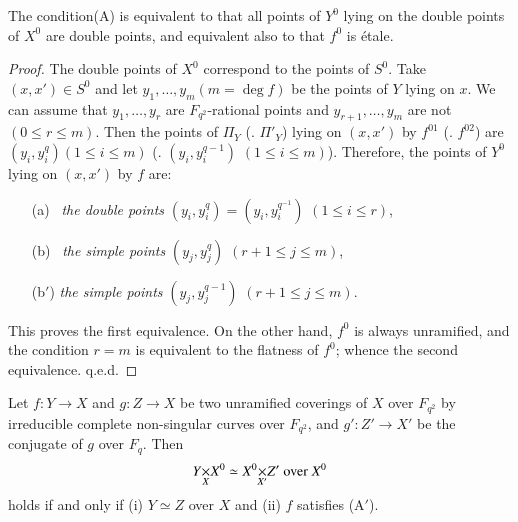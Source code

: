 \setcounter{subprop}{4}
\begin{subprop}\label{art6-subprop4.2.5}
The condition\pageoriginale (A) is equivalent to that all points of $Y^0$ lying on the double points of $X^0$ are double points, and equivalent also to that $f^0$ is \'etale.
\end{subprop}

\begin{proof}
The double points of $X^0$ correspond to the points of $S^0$. Take $(x, x') \in S^0$ and let $y_1, \ldots, y_m (m = \deg f)$ be the points of $Y$ lying on $x$. We can assume that $y_1, \ldots, y_r$ are $F_{q^2}$-rational points and $y_{r+1}, \ldots, y_m$ are not $(0 \leqslant r \leqslant m)$. Then the points of $\Pi_Y$ (\resp. $\Pi'_Y$) lying on $(x, x')$ by $f^{01}$ (\resp. $f^{02}$) are $(y_i, y^q_i) (1 \leqslant i \leqslant m)$ (\resp. $(y_i, y^{q-1}_i)$ $(1 \leqslant i \leqslant m)$). Therefore, the points of $Y^0$ lying on $(x, x')$ by $f$ are:
\begin{itemize}
\item[(a)~] \textit{the double points} \quad $(y_i, y^q_i) = (y_i, y^{q^{-1}}_i)$ \hfill$(1\leqslant i \leqslant r)$,

\item[(b)~] \textit{the simple points} \quad $(y_j, y^q_j)$ \hfill $(r + 1 \leqslant  j \leqslant m)$,

\item[(b$'$)] \textit{the simple points} \quad $(y_j, y^{q-1}_j)$ \hfill$(r+1 \leqslant j \leqslant m)$.
\end{itemize}
This proves the first equivalence. On the other hand, $f^0$ is always unramified, and the condition $r =m$ is equivalent to the flatness of $f^0$; whence the second equivalence. q.e.d.
\end{proof}

\setcounter{sublemma}{5}
\begin{sublemma}\label{art6-sublem4.2.6}
Let $f : Y \to X$ and $g : Z \to X$ be two unramified coverings of $X$ over $F_{q^2}$ by irreducible complete non-singular curves over $F_{q^2}$, and $g' : Z' \to X'$ be the conjugate of $g$ over $F_q$. Then
$$
\fprod{Y}{X^0}{X} \simeq \fprod{X^0}{Z'}{X'} \text{ over } X^0
$$
holds if and only if (i) $Y \simeq Z$ over $X$ and (ii) $f$ satisfies (A$'$).
\end{sublemma}

